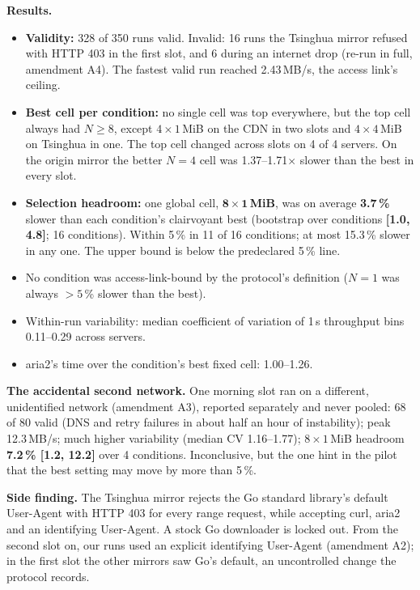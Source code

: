 \textbf{Results.}
\begin{itemize}
\item \textbf{Validity:} 328 of 350 runs valid. Invalid: 16 runs the Tsinghua mirror refused with HTTP 403 in the first slot, and 6 during an internet drop (re-run in full, amendment A4). The fastest valid run reached 2.43\,MB/s, the access link's ceiling.
\item \textbf{Best cell per condition:} no single cell was top everywhere, but the top cell always had $N\ge8$, except $4\times1$\,MiB on the CDN in two slots and $4\times4$\,MiB on Tsinghua in one. The top cell changed across slots on 4 of 4 servers. On the origin mirror the better $N=4$ cell was 1.37--1.71$\times$ slower than the best in every slot.
\item \textbf{Selection headroom:} one global cell, $\mathbf{8\times1}$\,\textbf{MiB}, was on average \textbf{3.7\,\%} slower than each condition's clairvoyant best (bootstrap over conditions \textbf{[1.0, 4.8]}; 16 conditions). Within 5\,\% in 11 of 16 conditions; at most 15.3\,\% slower in any one. The upper bound is below the predeclared 5\,\% line.
\item No condition was access-link-bound by the protocol's definition ($N=1$ was always $>5$\,\% slower than the best).
\item Within-run variability: median coefficient of variation of 1\,s throughput bins 0.11--0.29 across servers.
\item aria2's time over the condition's best fixed cell: 1.00--1.26.
\end{itemize}

\textbf{The accidental second network.} One morning slot ran on a different, unidentified network (amendment A3), reported separately and never pooled: 68 of 80 valid (DNS and retry failures in about half an hour of instability); peak 12.3\,MB/s; much higher variability (median CV 1.16--1.77); $8\times1$\,MiB headroom \textbf{7.2\,\% [1.2, 12.2]} over 4 conditions. Inconclusive, but the one hint in the pilot that the best setting may move by more than 5\,\%.

\textbf{Side finding.} The Tsinghua mirror rejects the Go standard library's default User-Agent with HTTP 403 for every range request, while accepting curl, aria2 and an identifying User-Agent. A stock Go downloader is locked out. From the second slot on, our runs used an explicit identifying User-Agent (amendment A2); in the first slot the other mirrors saw Go's default, an uncontrolled change the protocol records.

